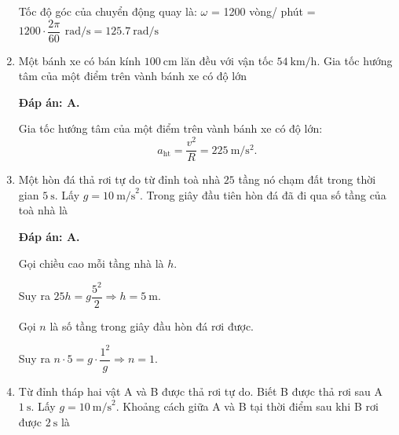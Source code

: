 \begin{enumerate}[label=\bfseries Câu \arabic*:]
{		Tốc độ góc của chuyển động quay là:
		$\omega$ = 1200 vòng/ phút = $1200\cdot\dfrac{2\pi}{60}\,\SI{}{\radian/\second}=\SI{125,7}{\radian/\second}$
		
		
	}
	\item {}
	
	\cauhoi
	{Một bánh xe có bán kính $\SI{100}{\centi\meter}$ lăn đều với vận tốc $\SI{54}{\kilo\meter/\hour}$. Gia tốc hướng tâm của một điểm trên vành bánh xe có độ lớn
	}
	\loigiai
	{\textbf{Đáp án: A.}
		
		Gia tốc hướng tâm của một điểm trên vành bánh xe có độ lớn:
		$$a_\text{ht}=\dfrac{v^2}{R}=\SI{225}{\meter/\second^2}.$$
		
		
	}
	\item {}
	
	\cauhoi
	{Một hòn đá thả rơi tự do từ đỉnh toà nhà $25$ tầng nó chạm đất trong thời gian $5\ \text{s}$. Lấy $g=10\ \text{m/s}^2$. Trong giây đầu tiên hòn đá đã đi qua số tầng của toà nhà là
	}
	\loigiai
	{\textbf{Đáp án: A.}
		
		Gọi chiều cao mỗi tầng nhà là $h$. 
		
		Suy ra $25h=g\dfrac{5^2}{2}\Rightarrow h=5\ \text{m}$.
		
		Gọi $n$ là số tầng trong giây đầu hòn đá rơi được.
		
		Suy ra $n\cdot 5=g\cdot \dfrac{1^2}{g}\Rightarrow n=1$.
		
		
	}
	\item {}
	
	\cauhoi
	{Từ đỉnh tháp hai vật A và B được thả rơi tự do. Biết B được thả rơi sau A $1\ \text{s}$. Lấy $g=10\ \text{m/s}^2$. Khoảng cách giữa A và B tại thời điểm sau khi B rơi được $2\ \text{s}$ là
		
}
\end{enumerate}
